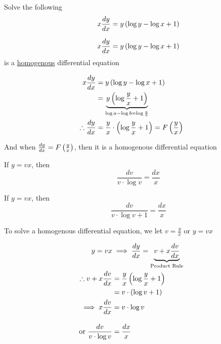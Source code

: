 \documentclass[14pt,fleqn]{extarticle}
\newcommand\yx{\frac{y}{x}}
\begin{document}
 
\begin{problem}
	\statement 
    
     Solve the following 
     \[ \qquad x\frac{dy}{dx} = y \left(\log y - \log x + 1 \right)\] 
     
    \begin{step}
  \begin{options} 
     \correct 
       
     \[ \qquad x\frac{dy}{dx} = y \left(\log y - \log x + 1 \right)\]
     is a \underline{homogenous} differential equation 
        
    \end{options} 
     \reason 
     
     \begin{align}
	x\dydx &= y \left(\log y - \log x + 1 \right) \\
	&= \underbrace{y \left(\log \yx + 1 \right)}_{\log a - \log b = \log \frac{a}{b}} \\
	\therefore \dydx &= \yx\cdot \left(\log\yx + 1 \right) = F \left(\yx \right)
\end{align}

And when $\dydx = F \left(\yx \right)$, then it is a homogenous differential equation
       
\end{step}

\begin{step}
  \begin{options} 
     \correct 
       
      If $y = vx$, then 
      \[ \qquad \frac{dv}{v\cdot\log v} = \frac{dx}{x} \] 
     \incorrect
     
     If $y = vx$, then 
      \[ \qquad \frac{dv}{v\cdot\log v + 1} = \frac{dx}{x} \] 
        
    \end{options} 
     \reason 
     
     To solve a homogenous differential equation, we let $v = \yx$ or $y = vx$ 
     
     \begin{align}
     y = vx &\implies \dydx = \underbrace{v + x\frac{dv}{dx}}_{\text{Product Rule}} \\
     \therefore v + x\frac{dv}{dx} &= \yx \left(\log\yx + 1 \right) \\
     &= v\cdot \left(\log v + 1 \right) \\
     \implies x\frac{dv}{dx} &= v\cdot\log v \\[10pt]
     \text{or } \frac{dv}{v\cdot\log v} &= \frac{dx}{x} 
\end{align}
       

\end{step}
\end{problem}
\end{document}
